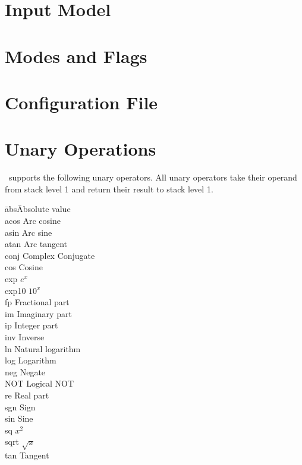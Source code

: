 \documentclass{report}
\begin{document}
\chapter{Input Model}

\chapter{Modes and Flags}

\chapter{Configuration File}

\chapter{Unary Operations}

\CLAC\ supports the following unary operators. All unary operators take their operand from stack
level 1 and return their result to stack level 1.

\begin{tabbing}
\hspace*{3em}\=abs\hspace{3em}\=Absolute value\\
\>             acos\>           Arc cosine\\
\>             asin\>           Arc sine\\
\>             atan\>           Arc tangent\\
\>             conj\>           Complex Conjugate\\
\>             cos\>            Cosine\\
\>             exp\>            $e^{x}$\\
\>             exp10\>          $10^{x}$\\
\>             fp\>             Fractional part\\
\>             im\>             Imaginary part\\
\>             ip\>             Integer part\\
\>             inv\>            Inverse\\
\>             ln\>             Natural logarithm\\
\>             log\>            Logarithm\\
\>             neg\>            Negate\\
\>             NOT\>            Logical NOT\\
\>             re\>             Real part\\
\>             sgn\>            Sign\\
\>             sin\>            Sine\\
\>             sq\>             $x^{2}$\\
\>             sqrt\>           $\sqrt{x}$\\
\>             tan\>            Tangent\\
\end{tabbing}
\end{document}
